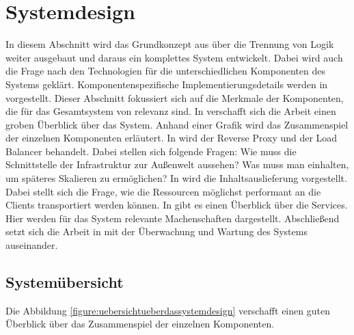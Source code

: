 \section{Systemdesign}
\label{sec:systemdesign}
In diesem Abschnitt wird das Grundkonzept aus 
über die Trennung von Logik weiter ausgebaut und daraus ein komplettes System
entwickelt. Dabei wird auch die Frage nach den Technologien für
die unterschiedlichen Komponenten des Systems geklärt. Komponentenspezifische
Implementierungsdetails werden in  vorgestellt. 
Dieser Abschnitt fokussiert sich auf die Merkmale der Komponenten,
die für das Gesamtsystem von relevanz sind. In  verschafft
sich die Arbeit einen groben Überblick über das System. Anhand einer Grafik wird das Zusammenspiel
der einzelnen Komponenten erläutert. In  
wird der Reverse Proxy und der Load Balancer behandelt.
Dabei stellen sich folgende Fragen: Wie muss die Schnittstelle der
Infrastruktur zur Außenwelt aussehen? Was muss man einhalten, um späteres
Skalieren zu ermöglichen? In  wird
die Inhaltsauslieferung vorgestellt. Dabei stellt sich die Frage,
wie die Ressourcen möglichst performant an die Clients transportiert
werden können. In  gibt es einen Überblick
über die Services. Hier werden für das System relevante Machenschaften
dargestellt. Abschließend setzt sich die Arbeit in 
mit der Überwachung und Wartung des Systems auseinander.

\subsection{Systemübersicht}
\label{subsec:systemuebersicht}
Die Abbildung \ref{figure:uebersichtueberdassystemdesign} verschafft einen guten Überblick
über das Zusammenspiel der einzelnen Komponenten. 

